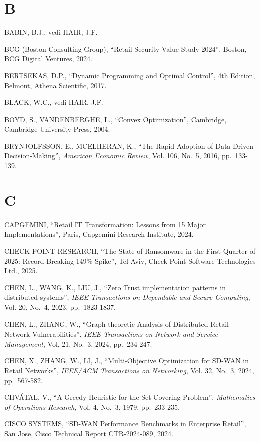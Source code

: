 \documentclass[12pt,a4paper,oneside]{book}
\numberwithin{figure}{chapter} %
\numberwithin{table}{chapter}  %
\begin{document}
\section{B}\label{b-1}

BABIN, B.J., vedi HAIR, J.F.

BCG (Boston Consulting Group), ``Retail Security Value Study 2024'',
Boston, BCG Digital Ventures, 2024.

BERTSEKAS, D.P., ``Dynamic Programming and Optimal Control'', 4th
Edition, Belmont, Athena Scientific, 2017.

BLACK, W.C., vedi HAIR, J.F.

BOYD, S., VANDENBERGHE, L., ``Convex Optimization'', Cambridge,
Cambridge University Press, 2004.

BRYNJOLFSSON, E., MCELHERAN, K., ``The Rapid Adoption of Data-Driven
Decision-Making'', \emph{American Economic Review}, Vol. 106, No.~5,
2016, pp.~133-139.

\section{C}\label{c-1}

CAPGEMINI, ``Retail IT Transformation: Lessons from 15 Major
Implementations'', Paris, Capgemini Research Institute, 2024.

CHECK POINT RESEARCH, ``The State of Ransomware in the First Quarter of
2025: Record-Breaking 149\% Spike'', Tel Aviv, Check Point Software
Technologies Ltd., 2025.

CHEN, L., WANG, K., LIU, J., ``Zero Trust implementation patterns in
distributed systems'', \emph{IEEE Transactions on Dependable and Secure
Computing}, Vol. 20, No.~4, 2023, pp.~1823-1837.

CHEN, L., ZHANG, W., ``Graph-theoretic Analysis of Distributed Retail
Network Vulnerabilities'', \emph{IEEE Transactions on Network and
Service Management}, Vol. 21, No.~3, 2024, pp.~234-247.

CHEN, X., ZHANG, W., LI, J., ``Multi-Objective Optimization for SD-WAN
in Retail Networks'', \emph{IEEE/ACM Transactions on Networking}, Vol.
32, No.~3, 2024, pp.~567-582.

CHVÁTAL, V., ``A Greedy Heuristic for the Set-Covering Problem'',
\emph{Mathematics of Operations Research}, Vol. 4, No.~3, 1979,
pp.~233-235.

CISCO SYSTEMS, ``SD-WAN Performance Benchmarks in Enterprise Retail'',
San Jose, Cisco Technical Report CTR-2024-089, 2024.
\end{document}
